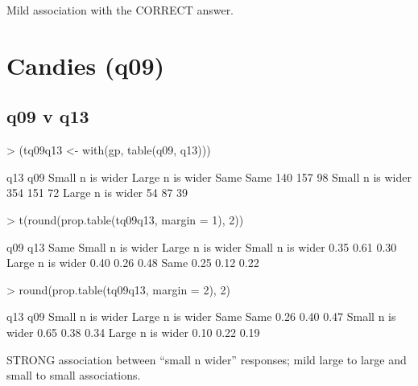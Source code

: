 \documentclass[11pt]{article}
\begin{document}
Mild association with the CORRECT answer.

\section{Candies (q09)}
\label{sec-3}
\subsection{q09 v q13}
\label{sec-3-1}
\begin{Schunk}
\begin{Sinput}
> (tq09q13 <- with(gp, table(q09, q13)))
\end{Sinput}
\begin{Soutput}
                  q13
q09                Small n is wider Large n is wider Same
  Same                          140              157   98
  Small n is wider              354              151   72
  Large n is wider               54               87   39
\end{Soutput}
\begin{Sinput}
> t(round(prop.table(tq09q13, margin = 1), 2))
\end{Sinput}
\begin{Soutput}
                  q09
q13                Same Small n is wider Large n is wider
  Small n is wider 0.35             0.61             0.30
  Large n is wider 0.40             0.26             0.48
  Same             0.25             0.12             0.22
\end{Soutput}
\begin{Sinput}
> round(prop.table(tq09q13, margin = 2), 2)
\end{Sinput}
\begin{Soutput}
                  q13
q09                Small n is wider Large n is wider Same
  Same                         0.26             0.40 0.47
  Small n is wider             0.65             0.38 0.34
  Large n is wider             0.10             0.22 0.19
\end{Soutput}
\end{Schunk}


STRONG association between ``small n wider'' responses; mild large to large and small to small associations.
\end{document}
